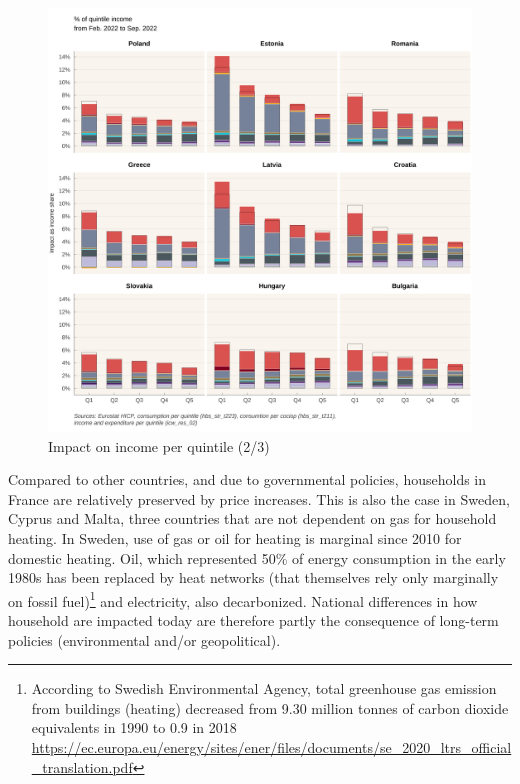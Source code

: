 \documentclass[
  9pt,
  a4paper,
  numbers=noendperiod,
  DIV=12]{scrartcl}
\begin{document}
\begin{figure}[htb]

\caption{\label{fig-impact3}Impact on income per quintile (2/3)}

{\centering \includegraphics[width=1\textwidth,height=\textheight]{SIWU_brief_files/figure-pdf/fig-impact3-1.png}

}

\end{figure}

\FloatBarrier

Compared to other countries, and due to governmental policies,
households in France are relatively preserved by price increases. This
is also the case in Sweden, Cyprus and Malta, three countries that are
not dependent on gas for household heating. In Sweden, use of gas or oil
for heating is marginal since 2010 for domestic heating. Oil, which
represented 50\% of energy consumption in the early 1980s has been
replaced by heat networks (that themselves rely only marginally on
fossil fuel)\footnote{According to Swedish Environmental Agency, total
  greenhouse gas emission from buildings (heating) decreased from 9.30
  million tonnes of carbon dioxide equivalents in 1990 to 0.9 in 2018
  \url{https://ec.europa.eu/energy/sites/ener/files/documents/se_2020_ltrs_official_translation.pdf}}
and electricity, also decarbonized. National differences in how
household are impacted today are therefore partly the consequence of
long-term policies (environmental and/or geopolitical).
\end{document}
